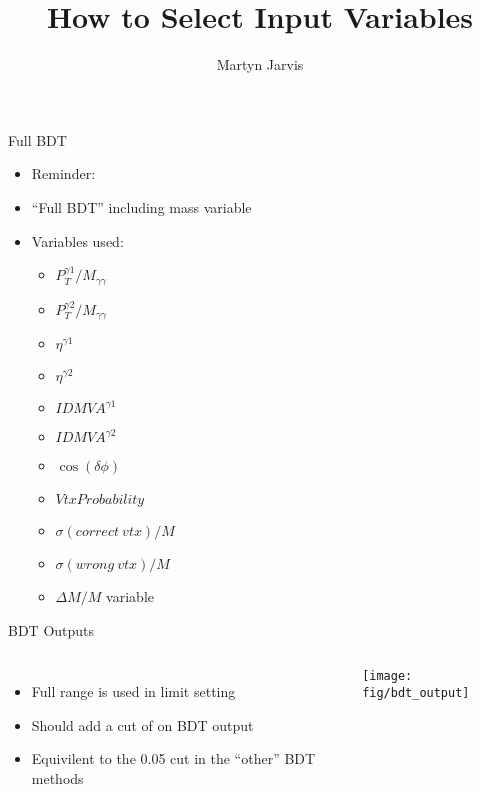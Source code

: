 \documentclass[t, 8pt]{beamer}
\author{Martyn Jarvis}
\title[Input Variables]{How to Select Input Variables}
\begin{document}


\begin{frame}{Full BDT}
  \begin{itemize}  
  \item Reminder:
  \item ``Full BDT'' including mass variable
  \item Variables used:
  \begin{itemize}  
    \item $P_T^{\gamma 1} / M_{\gamma \gamma}$
    \item $P_T^{\gamma 2} / M_{\gamma \gamma}$
    \item $\eta^{\gamma 1}$
    \item $\eta^{\gamma 2}$
    \item $ID MVA^{\gamma 1}$
    \item $ID MVA^{\gamma 2}$
    \item $\cos( \delta \phi )$
    \item $Vtx Probability$
    \item $\sigma(correct ~vtx)/M$
    \item $\sigma(wrong ~vtx)/M$
    \item \alert{$\Delta M/M$ variable}
  \end{itemize}
  \end{itemize}
\end{frame}

\begin{frame}{BDT Outputs}
  \begin{columns}[c]
  \begin{itemize}
    \item Full range is used in limit setting
    \item Should add a cut of on BDT output
    \item Equivilent to the 0.05 cut in the ``other'' BDT methods
  \end{itemize}
    \texttt{[image: fig/bdt\_output]}
  \end{columns}
\end{frame}
\end{document}
